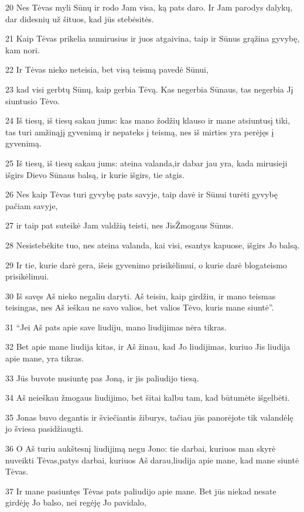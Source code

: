 \par 20 Nes Tėvas myli Sūnų ir rodo Jam visa, ką pats daro. Ir Jam parodys dalykų, dar didesnių už šituos, kad jūs stebėsitės. 
\par 21 Kaip Tėvas prikelia numirusius ir juos atgaivina, taip ir Sūnus grąžina gyvybę, kam nori. 
\par 22 Ir Tėvas nieko neteisia, bet visą teismą pavedė Sūnui, 
\par 23 kad visi gerbtų Sūnų, kaip gerbia Tėvą. Kas negerbia Sūnaus, tas negerbia Jį siuntusio Tėvo. 
\par 24 Iš tiesų, iš tiesų sakau jums: kas mano žodžių klauso ir mane atsiuntusį tiki, tas turi amžinąjį gyvenimą ir nepateks į teismą, nes iš mirties yra perėjęs į gyvenimą. 
\par 25 Iš tiesų, iš tiesų sakau jums: ateina valanda,­ir dabar jau yra,­ kada mirusieji išgirs Dievo Sūnaus balsą, ir kurie išgirs, tie atgis. 
\par 26 Nes kaip Tėvas turi gyvybę pats savyje, taip davė ir Sūnui turėti gyvybę pačiam savyje, 
\par 27 ir taip pat suteikė Jam valdžią teisti, nes Jis­Žmogaus Sūnus. 
\par 28 Nesistebėkite tuo, nes ateina valanda, kai visi, esantys kapuose, išgirs Jo balsą. 
\par 29 Ir tie, kurie darė gera, išeis gyvenimo prisikėlimui, o kurie darė bloga­teismo prisikėlimui. 
\par 30 Iš savęs Aš nieko negaliu daryti. Aš teisiu, kaip girdžiu, ir mano teismas teisingas, nes Aš ieškau ne savo valios, bet valios Tėvo, kuris mane siuntė”. 
\par 31 “Jei Aš pats apie save liudiju, mano liudijimas nėra tikras. 
\par 32 Bet apie mane liudija kitas, ir Aš žinau, kad Jo liudijimas, kuriuo Jis liudija apie mane, yra tikras. 
\par 33 Jūs buvote nusiuntę pas Joną, ir jis paliudijo tiesą. 
\par 34 Aš neieškau žmogaus liudijimo, bet šitai kalbu tam, kad būtumėte išgelbėti. 
\par 35 Jonas buvo degantis ir šviečiantis žiburys, tačiau jūs panorėjote tik valandėlę jo šviesa pasidžiaugti. 
\par 36 O Aš turiu aukštesnį liudijimą negu Jono: tie darbai, kuriuos man skyrė nuveikti Tėvas,­patys darbai, kuriuos Aš darau,­liudija apie mane, kad mane siuntė Tėvas. 
\par 37 Ir mane pasiuntęs Tėvas pats paliudijo apie mane. Bet jūs niekad nesate girdėję Jo balso, nei regėję Jo pavidalo, 
